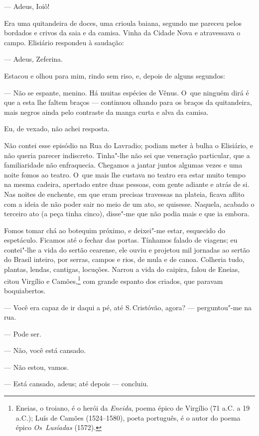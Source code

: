 \begin{linenumbers}
--- Adeus, Ioiô!

Era uma quitandeira de doces, uma crioula baiana, segundo me pareceu
pelos bordados e crivos da saia e da camisa. Vinha da Cidade Nova e
atravessava o campo. Elisiário respondeu à saudação:

--- Adeus, Zeferina.

Estacou e olhou para mim, rindo sem riso, e, depois de alguns segundos:

--- Não se espante, menino. Há muitas espécies de Vênus. O~que ninguém
dirá é que a esta lhe faltem braços --- continuou olhando para os braços
da quitandeira, mais negros ainda pelo contraste da manga curta e alva
da camisa.

Eu, de vexado, não achei resposta.

Não contei esse episódio na Rua do Lavradio; podiam meter à bulha o
Elisiário, e não queria parecer indiscreto. Tinha"-lhe não sei que
veneração particular, que a familiaridade não enfraquecia. Chegamos a
jantar juntos algumas vezes e uma noite fomos ao teatro. O~que mais lhe
custava no teatro era estar muito tempo na mesma cadeira, apertado entre
duas pessoas, com gente adiante e atrás de si. Nas noites de enchente,
em que eram precisas travessas na plateia, ficava aflito com a ideia de
não poder sair no meio de um ato, se quisesse. Naquela, acabado o
terceiro ato (a peça tinha cinco), disse"-me que não podia mais e que ia
embora.

Fomos tomar chá ao botequim próximo, e deixei"-me estar, esquecido do
espetáculo. Ficamos até o fechar das portas. Tínhamos falado de viagens;
eu contei"-lhe a vida do sertão cearense, ele ouviu e projetou mil
jornadas ao sertão do Brasil inteiro, por serras, campos e rios, de mula
e de canoa. Colheria tudo, plantas, lendas, cantigas, locuções. Narrou a
vida do caipira, falou de Eneias, citou Virgílio e Camões,\footnote{Eneias,
  o troiano, é o herói da \emph{Eneida}, poema épico de Virgílio (71
  a.C. a 19 a.C.); Luís de Camões (1524--1580), poeta português, é o
  autor do poema épico \emph{Os~Lusíadas} (1572).} com grande espanto
dos criados, que paravam boquiabertos.

--- Você era capaz de ir daqui a pé, até S.\,Cristóvão, agora? ---
perguntou"-me na rua.

--- Pode ser.

--- Não, você está cansado.

--- Não estou, vamos.

--- Está cansado, adeus; até depois --- concluiu.


\end{linenumbers}
